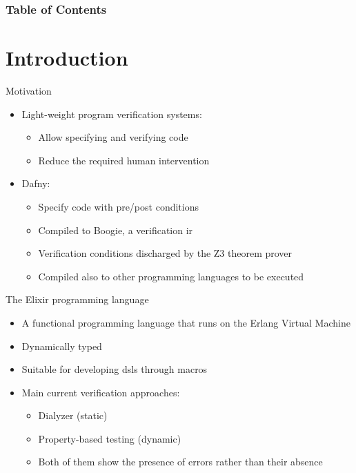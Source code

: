 \documentclass{beamer}
\title{\titulo}
\subtitle{Master's Degree in Formal Methods and Computer Engineering}
\date{\today}
\author{\autor \\ Supervisor: Manuel Montenegro Montes}
\institute{Complutense University of Madrid}
\begin{document}
  \maketitle
  \begin{frame}
    \frametitle{Table of Contents}
    \tableofcontents
  \end{frame}
  \section{Introduction}
  \begin{frame}{Motivation}
    \begin{itemize}
      \item \pause Light-weight program verification systems:
      \begin{itemize}
        \item \pause Allow specifying and verifying code
        \item \pause Reduce the required human intervention
      \end{itemize}
      \item \pause Dafny:
      \begin{itemize}
        \item \pause Specify code with pre/post conditions
        \item \pause Compiled to Boogie, a verification \gls*{ir}
        \item \pause Verification conditions discharged by the Z3 theorem prover
        \item \pause Compiled also to other programming languages to be executed
      \end{itemize}
    \end{itemize}
  \end{frame}
  \begin{frame}{The Elixir programming language}
    \begin{itemize}
      \item \pause A functional programming language that runs on the Erlang Virtual Machine
      \item \pause Dynamically typed
      \item \pause Suitable for developing \gls*{dsl}s through macros
      \item \pause Main current verification approaches:
      \begin{itemize}
        \item \pause Dialyzer (static)
        \item \pause Property-based testing (dynamic)
        \item \pause Both of them show the presence of errors rather than their absence
      \end{itemize}
    \end{itemize}
  \end{frame}
\end{document}
